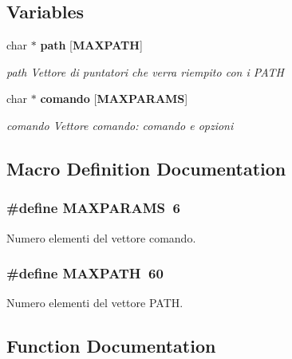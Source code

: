 \subsection*{Variables}
\begin{DoxyCompactItemize}
\item 
char $\ast$ {\bf path} [{\bf M\+A\+X\+P\+A\+TH}]
\begin{DoxyCompactList}\small\item\em path Vettore di puntatori che verra\textquotesingle{} riempito con i P\+A\+TH \end{DoxyCompactList}\item 
char $\ast$ {\bf comando} [{\bf M\+A\+X\+P\+A\+R\+A\+MS}]
\begin{DoxyCompactList}\small\item\em comando Vettore comando\+: comando e opzioni \end{DoxyCompactList}\end{DoxyCompactItemize}


\subsection{Macro Definition Documentation}
\subsubsection[{M\+A\+X\+P\+A\+R\+A\+MS}]{\setlength{\rightskip}{0pt plus 5cm}\#define M\+A\+X\+P\+A\+R\+A\+MS~6}\label{mysh-0_82_8c_a5fdce82727e278d6647e0addafcd6db6}


Numero elementi del vettore comando. 

\subsubsection[{M\+A\+X\+P\+A\+TH}]{\setlength{\rightskip}{0pt plus 5cm}\#define M\+A\+X\+P\+A\+TH~60}\label{mysh-0_82_8c_a2d1edde91ea515b363277f4bbdc3244d}


Numero elementi del vettore P\+A\+TH. 



\subsection{Function Documentation}
